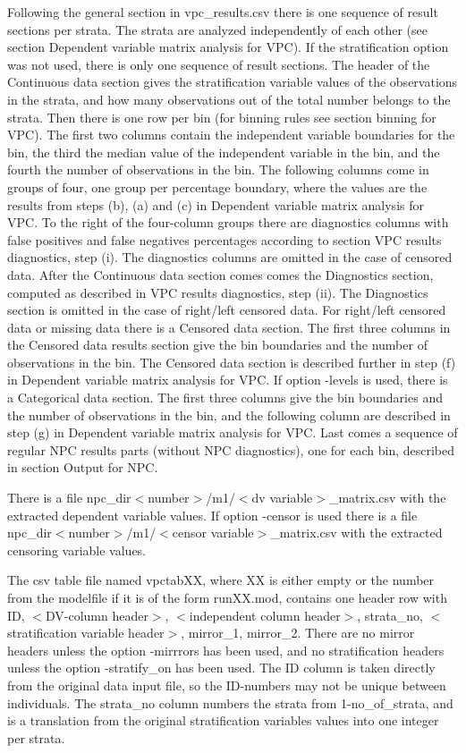 Following the general section in vpc\_results.csv there is one sequence of result sections per strata. The strata are analyzed independently of each other (see section Dependent variable matrix analysis for VPC). If the stratification option was not used, there is only one sequence of result sections. The header of the Continuous data section gives the stratification variable values of the observations in the strata, and how many observations out of the total number belongs to the strata. Then there is one row per bin (for binning rules see section binning for VPC). The first two columns contain the independent variable boundaries for the bin, the third the median value of the independent variable in the bin, and the fourth the number of observations in the bin. 
The following columns come in groups of four, one group per percentage boundary, where the values are the results from steps (b), (a) and (c) in Dependent variable matrix analysis for VPC. To the right of the four-column groups there are diagnostics columns with false positives and false negatives percentages according to section VPC results diagnostics, step (i). The diagnostics columns are omitted in the case of censored data. After the Continuous data section comes comes the Diagnostics section, computed as described in VPC results diagnostics, step (ii). The Diagnostics section is omitted in the case of right/left censored data. For right/left censored data or missing data there is a Censored data section. The first three columns in the Censored data results section give the bin boundaries and the number of observations in the bin. The Censored data section is described further in step (f) in Dependent variable matrix analysis for VPC. If option -levels is used, there is a Categorical data section. The first three columns give the bin boundaries and the number of observations in the bin, and the following column are described in step (g) in Dependent variable matrix analysis for VPC. Last comes a sequence of regular NPC results parts (without NPC diagnostics), one for each bin, described in section Output for NPC. 

There is a file npc\_dir$<$number$>$/m1/$<$dv variable$>$\_matrix.csv with the extracted dependent variable values. If option -censor is used there is a file npc\_dir$<$number$>$/m1/$<$censor variable$>$\_matrix.csv with the extracted censoring variable values.

The csv table file named vpctabXX, where XX is either empty or the number from the modelfile if it is of the form runXX.mod, contains one header row with ID, $<$DV-column header$>$, $<$independent column header$>$, strata\_no, $<$stratification variable header$>$, mirror\_1, mirror\_2. There are no mirror headers unless the option -mirrrors has been used, and no stratification headers unless the option -stratify\_on has been used. The ID column is taken directly from the original data input file, so the ID-numbers may not be unique between individuals. The strata\_no column numbers the strata from 1-no\_of\_strata, and is a translation from the original stratification variables values into one integer per strata.

